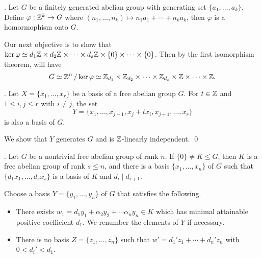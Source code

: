 \thm. Let \(G\) be a finitely generated abelian group with generating set \(\{a_1, \dots, a_k\}\). Define \(\varphi : \mathbb{Z}^k \rightarrow G\) where \((n_1, \dots, n_k) \mapsto n_1a_1 + \cdots + n_ka_k\), then \(\varphi\) is a homormophism onto \(G\).


Our next objective is to show that \(\ker \varphi \simeq d_1 \mathbb{Z} \times d_2 \mathbb{Z} \times \cdots \times d_s \mathbb{Z} \times \{0\} \times \cdots \times \{0\}\). Then by the first isomorphism theorem, will have
\[
    G \simeq \mathbb{Z}^n \operatorname{/} \ker \varphi \simeq \mathbb{Z}_{d_1} \times \mathbb{Z}_{d_2} \times \cdots \times \mathbb{Z}_{d_s} \times \mathbb{Z} \times \cdots \times \mathbb{Z}.
\]


\lemma. Let \(X = \{x_1, \dots, x_r\}\) be a basis of a free abelian group \(G\). For \(t \in \mathbb{Z}\) and \(1 \leq i, j \leq r\) with \(i \neq j\), the set
\[
    Y = \{x_1, \dots, x_{j-1}, x_j + tx_i, x_{j+1}, \dots, x_r\}
\]
is also a basis of \(G\).

\pf We show that \(Y\) generates \(G\) and is \(\mathbb{Z}\)-linearly independent. \qed

\lemma. Let \(G\) be a nontrivial free abelian group of rank \(n\). If \(\{0\} \neq K \leq G\), then \(K\) is a free abelian group of rank \(s \leq n\), and there is a basis \(\{x_1, \dots, x_n\}\) of \(G\) such that \(\{d_1 x_1, \dots, d_s x_s\}\) is a basis of \(K\) and \(d_i \mid d_{i+1}\).

\pf Choose a basis \(Y = \{y_1, \dots, y_n\}\) of \(G\) that satisfies the following.
\begin{itemize}
    \item There exists \(w_1 = d_1y_1 + \alpha_2 y_2 + \cdots \alpha_n y_n \in K\) which has minimal attainable positive coefficient \(d_1\). We renumber the elements of \(Y\) if necessary.
    \item There is no basis \(Z = \{z_1, \dots, z_n\}\) such that \(w' = d_1' z_1 + \cdots + d_n' z_n\) with \(0 < d_i' < d_1\).
\end{itemize}

